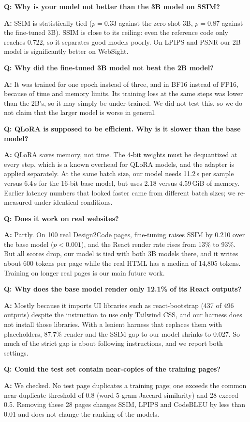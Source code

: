 \documentclass[11pt,a4paper]{article}
\newcommand{\q}[1]{\par\medskip\noindent\textbf{\color{navy}Q: #1}\par}
\newcommand{\ans}{\noindent\textbf{A:} }
\begin{document}
\q{Why is your model not better than the 3B model on SSIM?}
\ans SSIM is statistically tied ($p=0.33$ against the zero-shot 3B, $p=0.87$ against the fine-tuned 3B). SSIM is close
to its ceiling: even the reference code only reaches 0.722, so it separates good models poorly. On LPIPS and PSNR our 2B
model is significantly better on WebSight.

\q{Why did the fine-tuned 3B model not beat the 2B model?}
\ans It was trained for one epoch instead of three, and in BF16 instead of FP16, because of time and memory limits. Its
training loss at the same steps was lower than the 2B's, so it may simply be under-trained. We did not test this, so we
do not claim that the larger model is worse in general.

\q{QLoRA is supposed to be efficient. Why is it slower than the base model?}
\ans QLoRA saves memory, not time. The 4-bit weights must be dequantized at every step, which is a known overhead for
QLoRA models, and the adapter is applied separately. At the same batch size, our model needs 11.2\,s per sample versus
6.4\,s for the 16-bit base model, but uses 2.18 versus 4.59\,GiB of memory. Earlier latency numbers that looked faster
came from different batch sizes; we re-measured under identical conditions.

\q{Does it work on real websites?}
\ans Partly. On 100 real Design2Code pages, fine-tuning raises SSIM by 0.210 over the base model ($p<0.001$), and the
React render rate rises from 13\% to 93\%. But all scores drop, our model is tied with both 3B models there, and it
writes about 600 tokens per page while the real HTML has a median of 14,805 tokens. Training on longer real pages is our
main future work.

\q{Why does the base model render only 12.1\% of its React outputs?}
\ans Mostly because it imports UI libraries such as react-bootstrap (437 of 496 outputs) despite the instruction to use
only Tailwind CSS, and our harness does not install those libraries. With a lenient harness that replaces them with
placeholders, 87.7\% render and the SSIM gap to our model shrinks to 0.027. So much of the strict gap is about following
instructions, and we report both settings.

\q{Could the test set contain near-copies of the training pages?}
\ans We checked. No test page duplicates a training page; one exceeds the common near-duplicate threshold of 0.8 (word
5-gram Jaccard similarity) and 28 exceed 0.5. Removing these 28 pages changes SSIM, LPIPS and CodeBLEU by less than 0.01
and does not change the ranking of the models.
\end{document}

